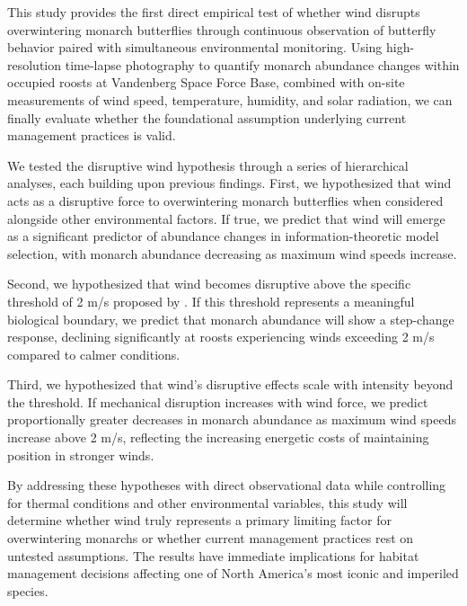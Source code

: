 
This study provides the first direct empirical test of whether wind disrupts overwintering monarch butterflies through continuous observation of butterfly behavior paired with simultaneous environmental monitoring. Using high-resolution time-lapse photography to quantify monarch abundance changes within occupied roosts at Vandenberg Space Force Base, combined with on-site measurements of wind speed, temperature, humidity, and solar radiation, we can finally evaluate whether the foundational assumption underlying current management practices is valid.

We tested the disruptive wind hypothesis through a series of hierarchical analyses, each building upon previous findings. First, we hypothesized that wind acts as a disruptive force to overwintering monarch butterflies when considered alongside other environmental factors. If true, we predict that wind will emerge as a significant predictor of abundance changes in information-theoretic model selection, with monarch abundance decreasing as maximum wind speeds increase.

Second, we hypothesized that wind becomes disruptive above the specific threshold of 2 m/s proposed by \citet{leongEvaluationManagementCalifornia2016}. If this threshold represents a meaningful biological boundary, we predict that monarch abundance will show a step-change response, declining significantly at roosts experiencing winds exceeding 2 m/s compared to calmer conditions.

Third, we hypothesized that wind's disruptive effects scale with intensity beyond the threshold. If mechanical disruption increases with wind force, we predict proportionally greater decreases in monarch abundance as maximum wind speeds increase above 2 m/s, reflecting the increasing energetic costs of maintaining position in stronger winds.

By addressing these hypotheses with direct observational data while controlling for thermal conditions and other environmental variables, this study will determine whether wind truly represents a primary limiting factor for overwintering monarchs or whether current management practices rest on untested assumptions. The results have immediate implications for habitat management decisions affecting one of North America's most iconic and imperiled species.